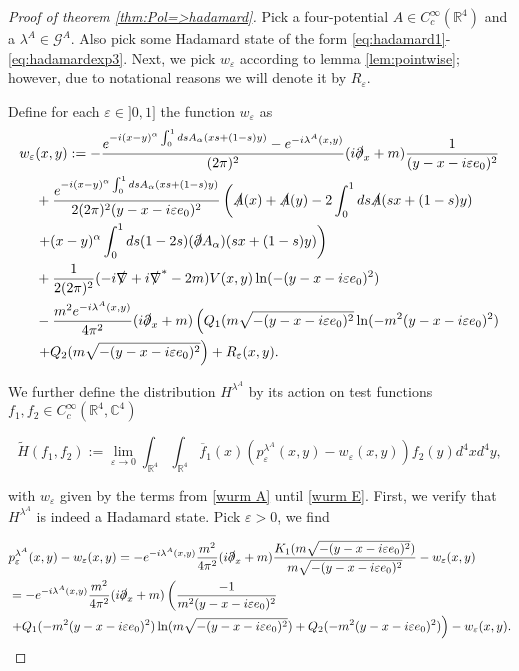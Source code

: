 \documentclass[b5paper,draft,openbib,12pt]{memoir}
\begin{document}
\begin{proof}[Proof of theorem \ref{thm:Pol=>hadamard}]
Pick a four-potential \(A\in C_c^\infty(\mathbb{R}^4)\)
and a \(\lambda^A\in\mathcal{G}^A\).
Also pick some Hadamard state of the form \eqref{eq:hadamard1}-\eqref{eq:hadamardexp3}.
Next, we pick \(w_\varepsilon\) according to lemma \ref{lem:pointwise}; however, due to notational reasons we will denote it by \(R_\varepsilon\).

Define for each \(\varepsilon \in ]0,1]\) the function \(w_\varepsilon\) as
\begin{align}\label{wurm A}
w_\varepsilon &(x,y):= -\frac{e^{-i (x-y)^\alpha\int_0^1 ds A_\alpha (x s + (1-s)y)}-e^{-i\lambda^A(x,y)}}{(2\pi)^2}(i\slashed{\partial}_x +m) \frac{1}{(y-x-i\varepsilon e_0)^2}\\
&+\frac{e^{-i (x-y)^\alpha\int_0^1 ds A_\alpha (x s + (1-s)y)}}{2(2\pi)^2 (y-x-i\varepsilon e_0)^2}\left( \slashed{A}(x)+\slashed{A}(y) -2 \int_0^1 ds \slashed{A}(sx +(1-s)y) \right.\\
&\left.+ (x-y)^\alpha \int_0^1 ds (1-2s)(\slashed{\partial}A_\alpha)(sx + (1-s)y) \right)\\
&+ \frac{1}{2(2\pi)^2} (-i\slashed{\nabla}+i\slashed{\nabla}^* -2m) V(x,y)\ln (-(y-x-i\varepsilon e_0)^2)\\\label{wurm E}
&-\frac{m^2 e^{-i \lambda^A(x,y)}}{4\pi^2} (i\slashed{\partial}_x+m)\left(Q_1(m\sqrt{-(y-x-i\varepsilon e_0)^2}\ln(-m^2(y-x-i\varepsilon e_0)^2)\right.\\
&\left.+Q_2(m\sqrt{-(y-x-i\varepsilon e_0)^2}\right) + R_\varepsilon(x,y).
\end{align}

We further define the distribution \(H^{\lambda^A}\) by its action on test functions 
\(f_1,f_2\in C_c^\infty(\mathbb{R}^4,\mathbb{C}^4)\)

\begin{equation}
\tilde{H}(f_1,f_2):=\lim_{\varepsilon \rightarrow 0} \int_{\mathbb{R}^4}\int_{\mathbb{R}^4} \overline{f}_1(x) (p_\varepsilon^{\lambda^A}(x,y)-w_\varepsilon(x,y)) f_2(y) d^4x d^4y,
\end{equation}

with \(w_\varepsilon\) given by the terms from \eqref{wurm A} until \eqref{wurm E}. First, we verify that \(H^{\lambda^A}\) is indeed a Hadamard state. Pick \(\varepsilon>0\), we find

\begin{align*}
&p_\varepsilon^{\lambda^A}(x,y)-w_\varepsilon(x,y)=-e^{-i\lambda^A(x,y)}\frac{m^2}{4\pi^2} (i\slashed{\partial}_x+m)
\frac{K_1(m\sqrt{-(y-x-i\varepsilon e_0)^2})}{m\sqrt{-(y-x-i\varepsilon e_0)^2}} - w_\varepsilon(x,y)\\
&=-e^{-i\lambda^A(x,y)}\frac{m^2}{4\pi^2} (i\slashed{\partial}_x+m) \left( \frac{-1}{m^2(y-x-i\varepsilon e_0)^2} \right.\\
&\left.+ Q_1(-m^2 (y-x-i\varepsilon e_0)^2) \ln (m\sqrt{-(y-x-i\varepsilon e_0)^2})
+ Q_2(-m^2 (y-x-i\varepsilon e_0)^2)\right) -w_\varepsilon(x,y).
\end{align*}


\end{proof}
\end{document}
